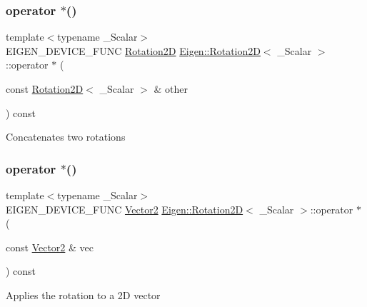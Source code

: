 \subsubsection{\texorpdfstring{operator $\ast$()}{operator *()}\hspace{0.1cm}{\footnotesize\ttfamily [1/2]}}
{\footnotesize\ttfamily template$<$typename \+\_\+\+Scalar$>$ \\
E\+I\+G\+E\+N\+\_\+\+D\+E\+V\+I\+C\+E\+\_\+\+F\+U\+NC \mbox{\hyperlink{class_eigen_1_1_rotation2_d}{Rotation2D}} \mbox{\hyperlink{class_eigen_1_1_rotation2_d}{Eigen\+::\+Rotation2D}}$<$ \+\_\+\+Scalar $>$\+::operator $\ast$ (\begin{DoxyParamCaption}\item[{const \mbox{\hyperlink{class_eigen_1_1_rotation2_d}{Rotation2D}}$<$ \+\_\+\+Scalar $>$ \&}]{other }\end{DoxyParamCaption}) const\hspace{0.3cm}{\ttfamily [inline]}}

Concatenates two rotations \mbox{\label{class_eigen_1_1_rotation2_d_a34e472a84d41708b9d36eb4e1e795fad}} 
\subsubsection{\texorpdfstring{operator $\ast$()}{operator *()}\hspace{0.1cm}{\footnotesize\ttfamily [2/2]}}
{\footnotesize\ttfamily template$<$typename \+\_\+\+Scalar$>$ \\
E\+I\+G\+E\+N\+\_\+\+D\+E\+V\+I\+C\+E\+\_\+\+F\+U\+NC \mbox{\hyperlink{class_eigen_1_1_matrix}{Vector2}} \mbox{\hyperlink{class_eigen_1_1_rotation2_d}{Eigen\+::\+Rotation2D}}$<$ \+\_\+\+Scalar $>$\+::operator $\ast$ (\begin{DoxyParamCaption}\item[{const \mbox{\hyperlink{class_eigen_1_1_matrix}{Vector2}} \&}]{vec }\end{DoxyParamCaption}) const\hspace{0.3cm}{\ttfamily [inline]}}

Applies the rotation to a 2D vector \mbox{\label{class_eigen_1_1_rotation2_d_a54405fc6f9d685c20e04f6f73129bf7c}} 

